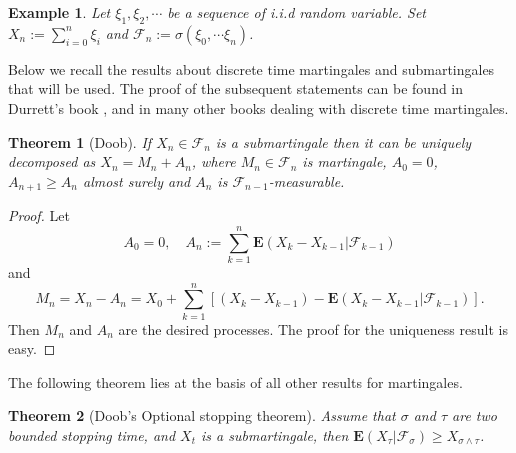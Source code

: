 \documentclass[twoside, 12pt]{book}
\numberwithin{equation}{chapter}
\newtheorem{theorem}{Theorem}[section]
\newtheorem{example}{Example}
\def\cF{{\mathcal F}}
\def\bE{{\mathbf E}}
\def\l{\left}
\def\r{\right}
\def\geq{\geqslant}
\begin{document}
	\begin{example}
		Let $\xi_1, \xi_2, \cdots$ be a sequence of i.i.d random variable. Set $X_n:=\sum_{i=0}^n \xi_i$ and $\cF_n:=\sigma(\xi_0,\cdots \xi_n)$. 
	\end{example}
	
 Below we recall the results about discrete time martingales and submartingales that will be used. The proof of the subsequent statements can be found in Durrett’s book \cite{durrett2019probability}, and in many other books dealing with discrete time martingales.
	\begin{theorem}[Doob]\label{thm:Doob-D}
 If $X_n\in \cF_n$  is a submartingale then it can be uniquely decomposed as $X_n=M_n+A_n$, where $M_n\in \cF_n$ is martingale, $A_0=0$, $A_{n+1}\geq A_n$ almost surely and $A_n$ is $\cF_{n-1}$-measurable.
	\end{theorem}
	\begin{proof}
		Let 
		\begin{equation*}
			A_0=0, \quad A_n:=\sum_{k=1}^n\bE (X_{k}-X_{k-1}|\cF_{k-1})
		\end{equation*}
		and 
		\[
		    M_n=X_n-A_n= X_0+ \sum_{k=1}^n \l[ (X_k-X_{k-1})- \bE (X_{k}-X_{k-1}|\cF_{k-1})\r]. 
		\]
		Then $M_n$ and $A_n$ are the desired processes. The proof for the uniqueness result is easy. 
	\end{proof}
	
	The following theorem lies at the basis of all other results for
	martingales.
	\begin{theorem}[Doob's Optional stopping theorem]\label{thm:Doob}
		Assume that $\sigma$ and $\tau$ are two bounded stopping time, and $X_t$ is a submartingale, then $\bE (X_{\tau}|\cF_{\sigma}) \geq  X_{\sigma\wedge \tau}$.  
	\end{theorem}
	
\end{document}
